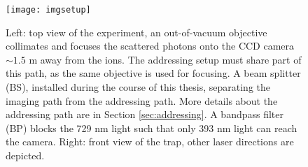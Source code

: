\begin{figure}
\centering
\texttt{[image: imgsetup]}
\caption[Caption for LOF]{Left: top view of the experiment, an out-of-vacuum objective collimates and focuses the scattered photons onto the CCD camera $\sim 1.5$ m away from the ions. The addressing setup must share part of this path, as the same objective is used for focusing.
A beam splitter (BS), installed during the course of this thesis, separating the imaging path from the addressing path. More details about the addressing path are in Section \ref{sec:addressing}.
A bandpass filter (BP) blocks the 729 nm light such that only 393 nm light can reach the camera. Right: front view of the trap, other laser directions are depicted.}
\label{imgsetup}
\end{figure}

